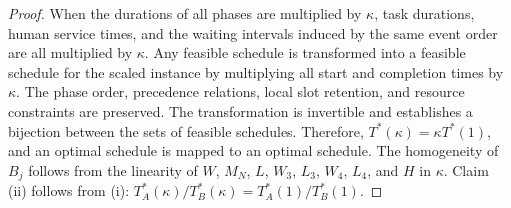 \begin{proof}
When the durations of all phases are multiplied by $\kappa$, task durations, human service times, and the waiting intervals induced by the same event order are all multiplied by $\kappa$. Any feasible schedule is transformed into a feasible schedule for the scaled instance by multiplying all start and completion times by $\kappa$. The phase order, precedence relations, local slot retention, and resource constraints are preserved. The transformation is invertible and establishes a bijection between the sets of feasible schedules. Therefore, $T^{*}(\kappa)=\kappa T^{*}(1)$, and an optimal schedule is mapped to an optimal schedule. The homogeneity of $B_j$ follows from the linearity of $W$, $M_N$, $L$, $W_3$, $L_3$, $W_4$, $L_4$, and $H$ in $\kappa$. Claim (ii) follows from (i): $T^{*}_A(\kappa)/T^{*}_B(\kappa)=T^{*}_A(1)/T^{*}_B(1)$.
\end{proof}

